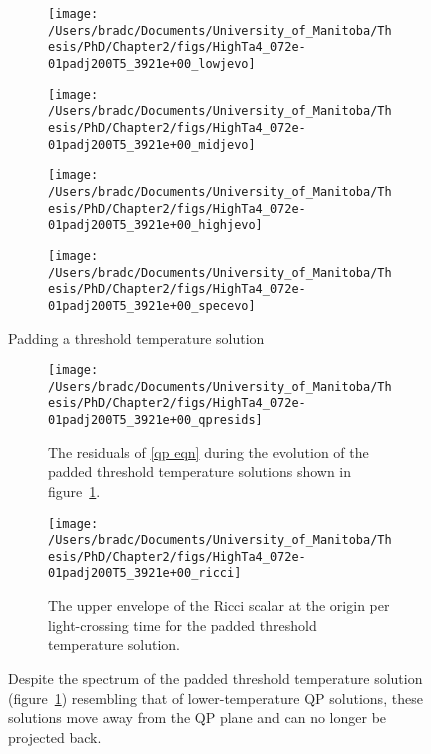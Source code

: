 \documentclass[../PhD.tex]{subfiles}
\begin{document}
\begin{figure}[h]
	\centering
	\begin{subfigure}[t]{0.45\textwidth}
		\texttt{[image: /Users/bradc/Documents/University\_of\_Manitoba/Thesis/PhD/Chapter2/figs/HighTa4\_072e-01padj200T5\_3921e+00\_lowjevo]}
	\end{subfigure}
	\;
	\begin{subfigure}[t]{0.45\textwidth}
		\texttt{[image: /Users/bradc/Documents/University\_of\_Manitoba/Thesis/PhD/Chapter2/figs/HighTa4\_072e-01padj200T5\_3921e+00\_midjevo]}
	\end{subfigure}
	\;
	\begin{subfigure}[t]{0.45\textwidth}
		\texttt{[image: /Users/bradc/Documents/University\_of\_Manitoba/Thesis/PhD/Chapter2/figs/HighTa4\_072e-01padj200T5\_3921e+00\_highjevo]}
	\end{subfigure}
	\;
	\begin{subfigure}[t]{0.45\textwidth}
		\texttt{[image: /Users/bradc/Documents/University\_of\_Manitoba/Thesis/PhD/Chapter2/figs/HighTa4\_072e-01padj200T5\_3921e+00\_specevo]}
	\end{subfigure}
	\caption[Evolution of the spectrum of a threshold temperature solution that has been padded with $100$ modes]{Padding a threshold temperature solution}
	\label{fig:HighTa4_072e-01padj200T5_3921e+00_evo}
\end{figure}

\begin{figure}[ht]
	\centering
	\begin{subfigure}[t]{0.45\textwidth}
		\texttt{[image: /Users/bradc/Documents/University\_of\_Manitoba/Thesis/PhD/Chapter2/figs/HighTa4\_072e-01padj200T5\_3921e+00\_qpresids]}
		\caption{The residuals of \eqref{qp eqn} during the evolution of the padded threshold temperature solutions shown in figure~\ref{fig:HighTa4_072e-01padj200T5_3921e+00_evo}.}
	\end{subfigure}
	\;
	\begin{subfigure}[t]{0.45\textwidth}
		\texttt{[image: /Users/bradc/Documents/University\_of\_Manitoba/Thesis/PhD/Chapter2/figs/HighTa4\_072e-01padj200T5\_3921e+00\_ricci]}
		\caption{The upper envelope of the Ricci scalar at the origin per light-crossing time for the padded threshold temperature solution.}
	\end{subfigure}
	\caption[Padded threshold temperature solutions cannot be projected back to the QP solution plane]{Despite the spectrum of the padded threshold temperature solution (figure~\ref{fig:HighTa4_072e-01padj200T5_3921e+00_evo}) resembling that of lower-temperature QP solutions, these solutions move away from the QP plane and can no longer be projected back.}
	\label{fig: HighTa4_072e-01padj200T5_3921e+00_projections}
\end{figure}
\end{document}
